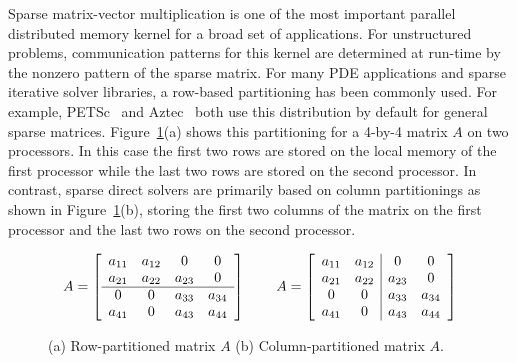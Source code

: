 \documentclass[10pt,relax]{PetraObjectModel}
\begin{document}
Sparse matrix-vector multiplication is one of the most important parallel
distributed memory kernel for a broad set of applications.  For
unstructured problems, communication patterns for this kernel are
determined at run-time by the nonzero pattern of the sparse matrix.
For many PDE applications and sparse iterative solver libraries, a
row-based partitioning has been commonly used.  For example,
PETSc~\cite{petsc-home-page,petsc-manual,petsc-efficient} and
Aztec~\cite{Aztec2.1} both use this distribution by default for
general sparse matrices.  Figure~\ref{fig:MatrixPartitions}(a) shows
this partitioning for a 4-by-4 matrix $A$ on two processors.  In this case
the first two rows are stored on the local memory of the first
processor while the last two rows are stored on the second processor.
In contrast, sparse direct
solvers are primarily based on column partitionings as shown in
Figure~\ref{fig:MatrixPartitions}(b), storing the first two columns of
the matrix on the first processor and the last two rows on the second processor.
\begin{figure}
\begin{center}
\begin{equation}
A=\left[
\begin{array}{cccc}
a_{11} & a_{12}&      0 &      0\\
a_{21} & a_{22}& a_{23} &      0\\\hline
     0 &     0 & a_{33} & a_{34}\\
a_{41} &     0 & a_{43} & a_{44}\\
\end{array}
\right]
\hspace{.3in}
A=\left[
\begin{array}{cc|cc}
a_{11} & a_{12}&      0 &      0\\
a_{21} & a_{22}& a_{23} &      0\\
     0 &     0 & a_{33} & a_{34}\\
a_{41} &     0 & a_{43} & a_{44}\\
\end{array}
\right]
\end{equation}
\end{center}
\caption{\label{fig:MatrixPartitions} (a) Row-partitioned matrix $A$ (b)
Column-partitioned matrix $A$.}
\end{figure}
\end{document}
